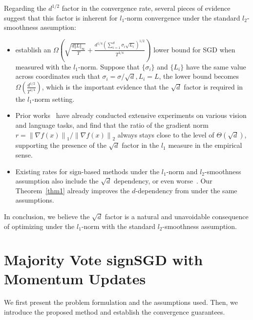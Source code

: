 \documentclass{article}
\newcommand{\Norm}[1]{\left\|#1\right\|}
\begin{document}
Regarding the $d^{1/2}$ factor in the convergence rate, several pieces of evidence suggest that this factor is inherent for $l_1$-norm convergence under the standard $l_2$-smoothness assumption:
\begin{itemize}
\item \cite{pmlr-v291-jiang25c} establish an $\Omega\left( \sqrt{ \frac{d \Vert L \Vert_\infty}{T} } + \frac{ d^{1/4} \left( \sum_{i=1}^d \sigma_i \sqrt{L_i} \right)^{1/2} }{ T^{1/4} } \right)$ lower bound for SGD when measured with the $l_1$-norm. Suppose that $\{\sigma_i\}$ and $\{L_i\}$ have the same value across coordinates such that $\sigma_i = \sigma/\sqrt{d}, L_i = L$, the lower bound becomes $\Omega\left( \frac{ d^{1/2}}{ T^{1/4} } \right)$, which is the important evidence that the $\sqrt{d}$ factor is required in the $l_1$-norm setting.
\item Prior works~\citep{pmlr-v80-bernstein18a,dong2024} have already conducted extensive experiments on various vision and language tasks, and find that the ratio of the gradient norm $r = \Norm{ \nabla f(x) }_1 / \Norm{ \nabla f(x) }_2$ always stays close to the level of $\Theta(\sqrt{d})$, supporting the presence of the $\sqrt{d}$ factor in the $l_1$ measure in the empirical sense.
\item Existing rates for sign-based methods under the $l_1$-norm and $l_2$-smoothness assumption also include the $\sqrt{d}$ dependency, or even worse~\citep{Jin2020StochasticSignSF, pmlr-v202-sun23l}. Our Theorem~\ref{thm1} already improves the $d$-dependency from \citet{pmlr-v202-sun23l} under the same assumptions.
\end{itemize}
In conclusion, we believe the $\sqrt{d}$ factor is a natural and unavoidable consequence of optimizing under the $l_1$-norm with the standard $l_2$-smoothness assumption.

\section{Majority Vote signSGD with Momentum Updates\label{sec:major-vote}}
We first present the problem formulation and the assumptions used. Then, we introduce the proposed method and establish the convergence guarantees.
\end{document}
